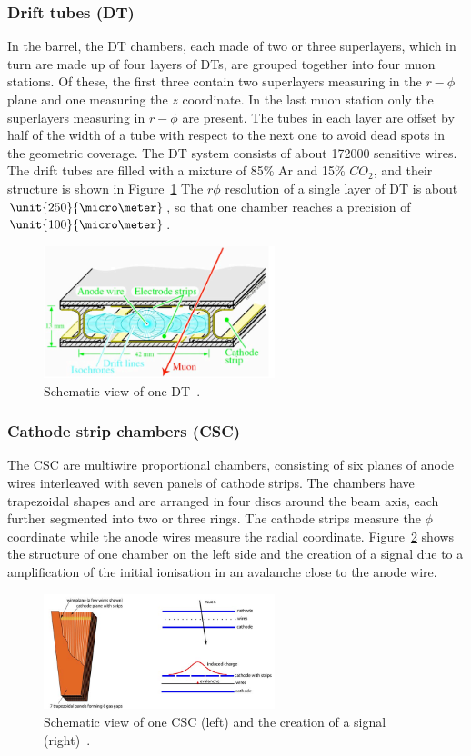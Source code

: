 \subsubsection*{Drift tubes (DT)}
In the barrel, the DT chambers, each made of two or three superlayers, which in turn are made up of four layers of DTs, are grouped together into four muon stations. Of these, the first three contain two superlayers measuring in the $r-\phi$ plane and one measuring the $z$ coordinate. In the last muon station only the superlayers measuring in $r-\phi$ are present. The tubes in each layer are offset by half of the width of a tube with respect to the next one to avoid dead spots in the geometric coverage. The DT system consists of about 172000 sensitive wires. The drift tubes are filled with a mixture of 85\% Ar and 15\% $CO_2$, and their structure is shown in Figure~\ref{fig:DT} The $r\phi$ resolution of a single layer of DT is about $\unit{250}{\micro\meter}$, so that one chamber reaches a precision of $\unit{100}{\micro\meter}$.
\begin{figure}[htbp]
\centering
  \includegraphics[width=0.6\textwidth]{plots/CMS/DT.png}
\caption{Schematic view of one DT~\cite{CMS}.}
\label{fig:DT}
\end{figure}  
\subsubsection*{Cathode strip chambers (CSC)}
The CSC are multiwire proportional chambers, consisting of six planes of anode wires interleaved with seven panels of cathode strips. The chambers have trapezoidal shapes and are arranged in four discs around the beam axis, each further segmented into two or three rings. The cathode strips measure the $\phi$ coordinate while the anode wires measure the radial coordinate. Figure~\ref{fig:CSC} shows the structure of one chamber on the left side and the creation of a signal due to a amplification of the initial ionisation in an avalanche close to the anode wire. 
\begin{figure}[htbp]
\centering
  \includegraphics[width=0.6\textwidth]{plots/CMS/CSC.png}
\caption{Schematic view of one CSC (left) and the creation of a signal (right)~\cite{CMS}.}
\label{fig:CSC}
\end{figure}  

